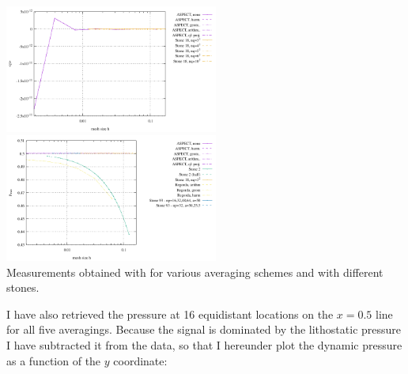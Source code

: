\begin{center}
\includegraphics[width=7cm]{images/stokes_sphere2D/pressure_mean_NS}
\includegraphics[width=7cm]{images/stokes_sphere2D/pressure_max_NS}\\
{\captionfont Measurements obtained with \aspect for various averaging schemes and with different stones.}
\end{center}


I have also retrieved the pressure at 16 equidistant locations on the $x=0.5$ line
for all five averagings. Because the signal is dominated by the lithostatic 
pressure I have subtracted it from the data, so that I hereunder plot the 
dynamic pressure as a function of the $y$ coordinate:


